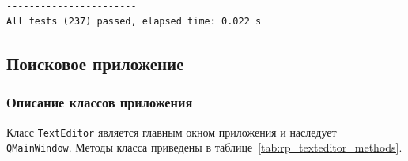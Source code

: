 \begin{lstlisting}[caption={Результат тестирования библиотеки}, label={fig:test_summary}]

-----------------------
All tests (237) passed, elapsed time: 0.022 s
\end{lstlisting}

\subsection{Поисковое приложение}

\subsubsection{Описание классов приложения}


Класс \verb`TextEditor` является главным окном приложения и наследует \verb`QMainWindow`. Методы класса приведены в таблице~\ref{tab:rp_texteditor_methods}.

